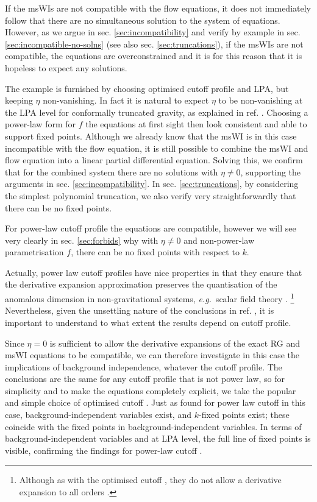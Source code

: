 \documentclass[11pt]{book} %
\newcommand\eg{\textit{e.g.}\ }
\numberwithin{equation}{chapter}
\begin{document}
If the msWIs are not compatible with the flow equations,
it does not immediately follow that there are no simultaneous solution to the system of equations.
However, as we argue in sec. \ref{sec:incompatibility} and verify by example in
sec. \ref{sec:incompatible-no-solns} (see also sec. \ref{sec:truncations}),
if the msWIs are not compatible, the equations are overconstrained and it is for this reason that
it is hopeless to expect any solutions.

The example is furnished by choosing optimised cutoff profile and LPA, but keeping $\eta$ non-vanishing.
In fact it is natural to expect $\eta$ to be non-vanishing at the LPA level for conformally truncated gravity,
as explained in ref. \cite{Dietz:2016gzg}.
Choosing a power-law form for $f$ the equations at first sight then look consistent and able
to support fixed points. Although we already know that the msWI is in this case incompatible with the
flow equation, it is still possible to combine the msWI and flow equation into a linear partial
differential equation. Solving this, we confirm that for the combined system there are no solutions
with $\eta\ne0$, supporting the arguments in sec. \ref{sec:incompatibility}.
In sec. \ref{sec:truncations}, by considering the simplest polynomial truncation,
we also verify very straightforwardly that there can be no fixed points.

For power-law cutoff profile the equations are compatible, however we will see very
clearly in sec. \ref{sec:forbids} why with $\eta\ne0$ and non-power-law parametrisation $f$,
there can be no fixed points with respect to $k$.

Actually, power law cutoff profiles have nice properties in  that they ensure that the derivative
expansion approximation preserves the quantisation of the anomalous dimension in non-gravitational systems,
\eg scalar field theory \cite{Morris:1994ie, Morris:1994jc, Morris:1998da}.%
\footnote{Although as with the optimised cutoff \cite{Litim:2000ci, Litim:2001fd},
they do not allow a derivative expansion to all orders \cite{Morris:2005ck, Morris:1999ba, Morris:2000hm}.}
Nevertheless, given the unsettling nature of the conclusions in ref.
\cite{Dietz:2015owa}, it is important to understand  to what extent the results depend on cutoff profile.

Since $\eta=0$ is sufficient to allow the derivative expansions of the exact RG and msWI equations
to be compatible, we can therefore investigate in this case the implications of background independence,
whatever the cutoff profile. The conclusions are the same for any cutoff profile that is not power law,
so for simplicity and to make the equations completely explicit,
we take the popular and simple choice of optimised cutoff \cite{Litim:2000ci, Litim:2001fd}.
Just as found for power law cutoff \cite{Dietz:2016gzg} in this case, background-independent variables exist,
and $k$-fixed points exist; these coincide with the fixed points in background-independent variables.
In terms of background-independent variables and at LPA level, the full line of fixed points
is visible, confirming the findings for power-law cutoff \cite{Dietz:2016gzg}.
\end{document}
